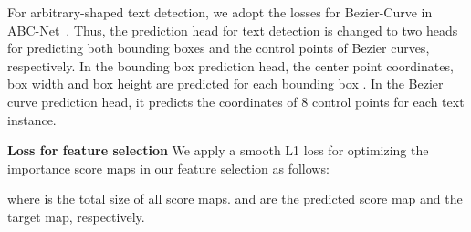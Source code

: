 \documentclass[10pt,twocolumn,letterpaper]{article}
\begin{document}
For arbitrary-shaped text detection, we adopt the losses for Bezier-Curve in ABC-Net~\cite{abcnet}. Thus, the prediction head for text detection is changed to two heads for predicting both bounding boxes and the control points of Bezier curves, respectively. In the bounding box prediction head, the center point coordinates, box width and box height are predicted for each bounding box . In the Bezier curve prediction head, it predicts the coordinates of 8 control points for each text instance.











\textbf{Loss for feature selection}
We apply a smooth L1 loss for optimizing the importance score maps in our feature selection as follows:

where  is the total size of all score maps.
 and  are the predicted score map and the target map, respectively.
\end{document}
